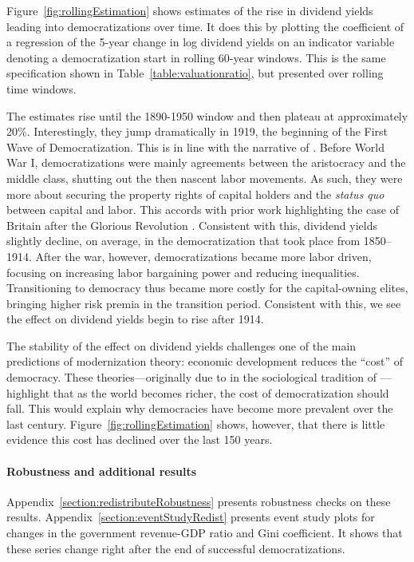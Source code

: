 \documentclass[12pt]{article}
\numberwithin{equation}{section}
\begin{document}
Figure~\ref{fig:rollingEstimation} shows estimates of the rise in dividend yields leading into democratizations over time. It does this by plotting the coefficient of a regression of the 5-year change in log dividend yields on an indicator variable denoting a democratization start in rolling 60-year windows. This is the same specification shown in Table~\ref{table:valuationratio}, but presented over rolling time windows.

The estimates rise until the 1890-1950 window and then plateau at approximately 20\%. Interestingly, they  jump dramatically  in 1919, the beginning of the First Wave of Democratization. This is in line with the narrative of \cite{Luebbert1991}. Before World War I, democratizations were mainly agreements between the aristocracy and the middle class, shutting out the then nascent labor movements. As such, they were more about securing the property rights of capital holders and the \textit{status quo} between capital and labor. This accords with prior work highlighting the case of Britain after the Glorious Revolution \citep{North1989,Acemoglu2006}. Consistent with this, dividend yields slightly decline, on average, in the democratization that took place from 1850--1914. After the war, however, democratizations became more labor driven, focusing on increasing labor bargaining power and reducing inequalities. Transitioning to democracy thus became more costly for the capital-owning elites, bringing higher risk premia in the transition period. Consistent with this, we see the effect on dividend yields begin to rise after 1914.

The stability of the effect on dividend yields challenges one of the main predictions of modernization theory: economic development reduces the ``cost'' of democracy.  These theories---originally due to \cite{Lipset1959} in the sociological tradition of \cite{Weber1946}---highlight that as the world becomes richer, the cost of democratization should fall. This would explain why democracies have become more prevalent over the last century. Figure~\ref{fig:rollingEstimation} shows, however, that there is little evidence this cost has declined over the last 150 years.

\paragraph{Robustness and additional results}

Appendix~\ref{section:redistributeRobustness} presents robustness checks on these results. Appendix~\ref{section:eventStudyRedist} presents event study plots for changes in the government revenue-GDP ratio and Gini coefficient. It shows that these series change right after the end of successful democratizations.
\end{document}
